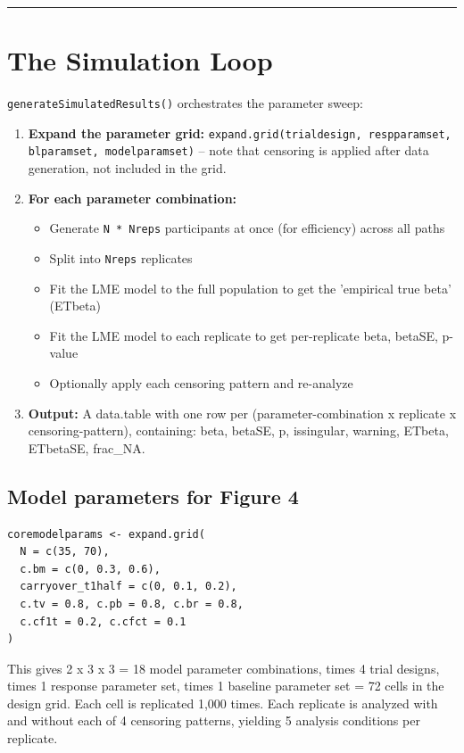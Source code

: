 \documentclass[11pt]{article}
\begin{document}
\bigskip\noindent\rule{\textwidth}{0.4pt}\bigskip

\section{The Simulation Loop}

\texttt{generateSimulatedResults()} orchestrates the parameter sweep:

\begin{enumerate}
  \item \textbf{Expand the parameter grid:}
    \texttt{expand.grid(trialdesign, respparamset, blparamset,
    modelparamset)} -- note that censoring is applied after
    data generation, not included in the grid.
  \item \textbf{For each parameter combination:}
    \begin{itemize}
      \item Generate \texttt{N * Nreps} participants at once (for efficiency)
        across all paths
      \item Split into \texttt{Nreps} replicates
      \item Fit the LME model to the full population to get the
        'empirical true beta' (ETbeta)
      \item Fit the LME model to each replicate to get per-replicate
        beta, betaSE, p-value
      \item Optionally apply each censoring pattern and re-analyze
    \end{itemize}
  \item \textbf{Output:} A data.table with one row per
    (parameter-combination x replicate x censoring-pattern),
    containing: beta, betaSE, p, issingular, warning, ETbeta,
    ETbetaSE, frac\_NA.
\end{enumerate}

\subsection{Model parameters for Figure 4}

\begin{lstlisting}
coremodelparams <- expand.grid(
  N = c(35, 70),
  c.bm = c(0, 0.3, 0.6),
  carryover_t1half = c(0, 0.1, 0.2),
  c.tv = 0.8, c.pb = 0.8, c.br = 0.8,
  c.cf1t = 0.2, c.cfct = 0.1
)
\end{lstlisting}

This gives 2 x 3 x 3 = 18 model parameter combinations, times
4 trial designs, times 1 response parameter set, times 1
baseline parameter set = 72 cells in the design grid. Each cell
is replicated 1,000 times. Each replicate is analyzed with and
without each of 4 censoring patterns, yielding 5 analysis
conditions per replicate.
\end{document}
